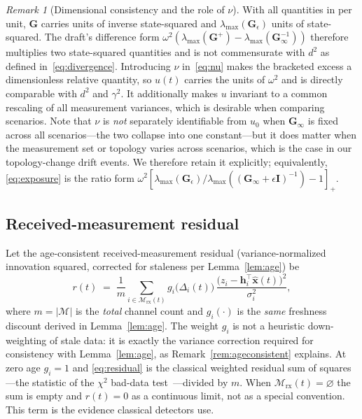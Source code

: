 \documentclass[journal]{IEEEtran}
\theoremstyle{plain}
\theoremstyle{definition}
\theoremstyle{remark}
\newtheorem{remark}{Remark}
\newcommand{\bxh}{\hat{\mathbf{x}}}
\newcommand{\bh}{\mathbf{h}}
\newcommand{\bG}{\mathbf{G}}
\newcommand{\bI}{\mathbf{I}}
\newcommand{\Mrx}{\mathcal{M}_{\mathrm{rx}}}
\newcommand{\lmax}{\lambda_{\max}}
\begin{document}
\begin{remark}[Dimensional consistency and the role of $\nu$]
\label{rem:units}
With all quantities in per unit, $\bG$ carries units of inverse
state-squared and $\lmax(\bG_{\epsilon})$ units of state-squared. The
draft's difference form $\omega^{2}(\lmax(\bG^{+})-\lmax(\bG_{\infty}^{-1}))$
therefore multiplies two state-squared quantities and is not commensurate
with $d^{2}$ as defined in~\eqref{eq:divergence}. Introducing $\nu$
in~\eqref{eq:nu} makes the bracketed excess a dimensionless relative
quantity, so $u(t)$ carries the units of $\omega^{2}$ and is directly
comparable with $d^{2}$ and $\gamma^{2}$. It additionally makes $u$
invariant to a common rescaling of all measurement variances, which is
desirable when comparing scenarios. Note that $\nu$ is \emph{not}
separately identifiable from $u_0$ when $\bG_{\infty}$ is fixed across all
scenarios---the two collapse into one constant---but it does matter when
the measurement set or topology varies across scenarios, which is the case
in our topology-change drift events. We therefore retain it explicitly;
equivalently, \eqref{eq:exposure} is the ratio form
$\omega^{2}[\lmax(\bG_{\epsilon})/\lmax((\bG_{\infty}+\epsilon\bI)^{-1})-1]_{+}$.
\end{remark}

\subsection{Received-measurement residual}
Let the age-consistent received-measurement residual (variance-normalized
innovation squared, corrected for staleness per Lemma~\ref{lem:age}) be
\begin{equation}
r(t)\;=\;\frac{1}{m}
\sum_{i\in\Mrx(t)}
g_i\!\big(\Delta_i(t)\big)\,
\frac{\big(z_i-\bh_i^{\top}\bxh(t)\big)^{2}}{\sigma_i^{2}},
\label{eq:residual}
\end{equation}
where $m=|\mathcal{M}|$ is the \emph{total} channel count and
$g_i(\cdot)$ is the \emph{same} freshness discount derived in
Lemma~\ref{lem:age}. The weight $g_i$ is not a heuristic down-weighting of
stale data: it is exactly the variance correction required for
consistency with Lemma~\ref{lem:age}, as Remark~\ref{rem:ageconsistent}
explains. At zero age $g_i=1$ and \eqref{eq:residual} is the classical
weighted residual sum of squares---the statistic of the $\chi^{2}$
bad-data test~\cite{abur2004,handschin1975}---divided by $m$. When $\Mrx(t)=\varnothing$ the sum is empty and $r(t)=0$ as a
continuous limit, not as a special convention. This term is the evidence
classical detectors use.
\end{document}
